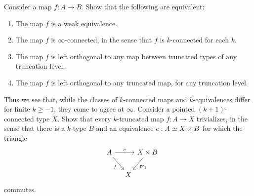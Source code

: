 \begin{exercises}
\begin{enumerate}
\end{enumerate}
\exercise Consider a map $f:A\to B$. Show that the following are equivalent:
  \begin{enumerate}
  \item The map $f$ is a weak equivalence.
  \item The map $f$ is $\infty$-connected, in the sense that $f$ is $k$-connected for each $k$.
  \item The map $f$ is left orthogonal to any map between truncated types of any truncation level.
  \item The map $f$ is left orthogonal to any truncated map, for any truncation level.
  \end{enumerate}
  Thus we see that, while the classes of $k$-connected maps and $k$-equivalences differ for finite $k\geq-1$, they come to agree at $\infty$.
  \exercise Consider a pointed $(k+1)$-connected type $X$. Show that every $k$-truncated map $f:A\to X$ trivializes, in the sense that there is a $k$-type $B$ and an equivalence $e:\eqv{A}{X\times B}$ for which the triangle
  \begin{equation*}
    \begin{tikzcd}[column sep=0]
      A \arrow[rr,"e"] \arrow[dr,swap,"f"] & & X\times B \arrow[dl,"\proj 1"] \\
      \phantom{X\times B} & X
    \end{tikzcd}
  \end{equation*}
  commutes.
\end{exercises}
